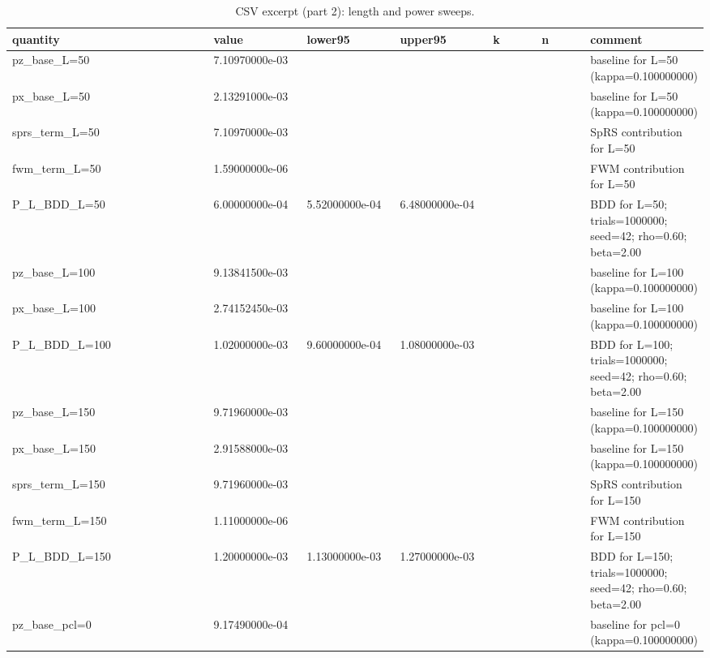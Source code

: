 \documentclass[conference]{IEEEtran}
\newcommand{\simtrials}{1000000}
\newcommand{\simseed}{42}
\newcommand{\simpz}{9.13841500e-03}
\newcommand{\simpx}{2.74152450e-03}
\newcommand{\simrhoB}{0.60}
\newcommand{\simpLB}{1.02000000e-03}
\newcommand{\simpLBlo}{9.60000000e-04}
\newcommand{\simpLBhi}{1.08000000e-03}
\newcommand{\simkB}{1020}
\newcommand{\simpzLfa}{7.10970000e-03}
\newcommand{\simpxLfa}{2.13291000e-03}
\newcommand{\simpLLfa}{6.00000000e-04}
\newcommand{\simpLLfalo}{5.52000000e-04}
\newcommand{\simpLLfahi}{6.48000000e-04}
\newcommand{\simkLfa}{600}
\newcommand{\simpzLfb}{9.71960000e-03}
\newcommand{\simpxLfb}{2.91588000e-03}
\newcommand{\simpLLfb}{1.20000000e-03}
\newcommand{\simpLLfblo}{1.13000000e-03}
\newcommand{\simpLLfbhi}{1.27000000e-03}
\newcommand{\simkLfb}{1200}
\newcommand{\simpzPclA}{9.17490000e-04}
\begin{document}
\begin{table}[t!]
\small
\centering
\caption{CSV excerpt (part 2): length and power sweeps.}
\label{tab:csv2}
\begin{adjustbox}{width=\linewidth}
\begin{tabular}{>{\raggedright\arraybackslash}p{0.32\linewidth} >{\raggedright\arraybackslash}p{0.14\linewidth} >{\raggedright\arraybackslash}p{0.14\linewidth} >{\raggedright\arraybackslash}p{0.14\linewidth} >{\raggedright\arraybackslash}p{0.08\linewidth} >{\raggedright\arraybackslash}p{0.08\linewidth} >{\raggedright\arraybackslash}p{0.36\linewidth}}
\toprule
quantity & value & lower95 & upper95 & k & n & comment \\
\midrule
pz\_base\_L=50 & \simpzLfa &  &  &  &  & baseline for L=50 (kappa=0.100000000) \\
px\_base\_L=50 & \simpxLfa &  &  &  &  & baseline for L=50 (kappa=0.100000000) \\
sprs\_term\_L=50 & 7.10970000e-03 &  &  &  &  & SpRS contribution for L=50 \\
fwm\_term\_L=50 & 1.59000000e-06 &  &  &  &  & FWM contribution for L=50 \\
P\_L\_BDD\_L=50 & \simpLLfa & \simpLLfalo & \simpLLfahi & \simkLfa & \simtrials & BDD for L=50; trials=\simtrials; seed=\simseed; rho=\simrhoB; beta=2.00 \\
pz\_base\_L=100 & \simpz &  &  &  &  & baseline for L=100 (kappa=0.100000000) \\
px\_base\_L=100 & \simpx &  &  &  &  & baseline for L=100 (kappa=0.100000000) \\
P\_L\_BDD\_L=100 & \simpLB & \simpLBlo & \simpLBhi & \simkB & \simtrials & BDD for L=100; trials=\simtrials; seed=\simseed; rho=\simrhoB; beta=2.00 \\
pz\_base\_L=150 & \simpzLfb &  &  &  &  & baseline for L=150 (kappa=0.100000000) \\
px\_base\_L=150 & \simpxLfb &  &  &  &  & baseline for L=150 (kappa=0.100000000) \\
sprs\_term\_L=150 & 9.71960000e-03 &  &  &  &  & SpRS contribution for L=150 \\
fwm\_term\_L=150 & 1.11000000e-06 &  &  &  &  & FWM contribution for L=150 \\
P\_L\_BDD\_L=150 & \simpLLfb & \simpLLfblo & \simpLLfbhi & \simkLfb & \simtrials & BDD for L=150; trials=\simtrials; seed=\simseed; rho=\simrhoB; beta=2.00 \\
pz\_base\_pcl=0 & \simpzPclA &  &  &  &  & baseline for pcl=0 (kappa=0.100000000) \\

\end{tabular}
\end{adjustbox}
\end{table}
\end{document}

